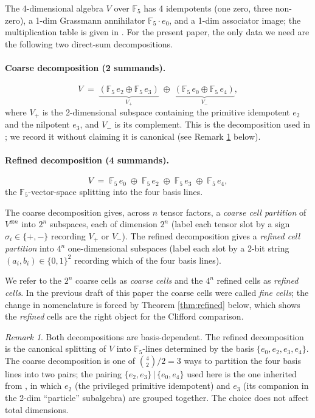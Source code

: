 \documentclass[11pt,reqno]{amsart}
\theoremstyle{plain}
\theoremstyle{definition}
\theoremstyle{remark}
\newtheorem*{remark}{Remark}
\newcommand{\F}{\mathbb{F}}
\begin{document}
The 4-dimensional algebra $V$ over $\F_5$ has 4 idempotents (one zero,
three non-zero), a 1-dim Grassmann annihilator $\F_5 \cdot e_0$, and a
1-dim associator image; the multiplication table is given in
\cite[Table~1]{SandersGishDiscreteDirac}.  For the present paper,
the only data we need are the following two direct-sum decompositions.

\paragraph{Coarse decomposition (2 summands).}
\[
V \;=\; \underbrace{(\F_5\, e_2 \oplus \F_5\, e_3)}_{V_+}
        \;\oplus\;
        \underbrace{(\F_5\, e_0 \oplus \F_5\, e_4)}_{V_-},
\]
where $V_+$ is the 2-dimensional subspace containing the primitive
idempotent $e_2$ and the nilpotent $e_3$, and $V_-$ is its complement.
This is the decomposition used in
\cite[\S2]{SandersGishDiscreteDirac}; we record it without claiming
it is canonical (see Remark \ref{rem:choice} below).

\paragraph{Refined decomposition (4 summands).}
\[
V \;=\; \F_5\, e_0 \;\oplus\; \F_5\, e_2 \;\oplus\; \F_5\, e_3 \;\oplus\; \F_5\, e_4,
\]
the $\F_5$-vector-space splitting into the four basis lines.

The coarse decomposition gives, across $n$ tensor factors, a
\emph{coarse cell partition} of $V^{\otimes n}$ into $2^n$ subspaces,
each of dimension $2^n$ (label each tensor slot by a sign
$\sigma_i \in \{+, -\}$ recording $V_+$ or $V_-$).
The refined decomposition gives a \emph{refined cell partition} into
$4^n$ one-dimensional subspaces (label each slot by a 2-bit string
$(a_i, b_i) \in \{0,1\}^2$ recording which of the four basis lines).

We refer to the $2^n$ coarse cells as \emph{coarse cells} and the
$4^n$ refined cells as \emph{refined cells}.  In the previous draft of
this paper the coarse cells were called \emph{fine cells}; the change
in nomenclature is forced by Theorem \ref{thm:refined} below, which
shows the \emph{refined} cells are the right object for the
Clifford comparison.

\begin{remark}\label{rem:choice}
Both decompositions are basis-dependent.  The refined decomposition is
the canonical splitting of $V$ into $\F_5$-lines determined by the
basis $\{e_0, e_2, e_3, e_4\}$.  The coarse decomposition is one of
$\binom{4}{2}/2 = 3$ ways to partition the four basis lines into two
pairs; the pairing $\{e_2, e_3\} \,|\, \{e_0, e_4\}$ used here is the
one inherited from \cite{SandersGishDiscreteDirac}, in which $e_2$
(the privileged primitive idempotent) and $e_3$ (its companion in the
2-dim ``particle'' subalgebra) are grouped together.
The choice does not affect total dimensions.
\end{remark}
\end{document}
